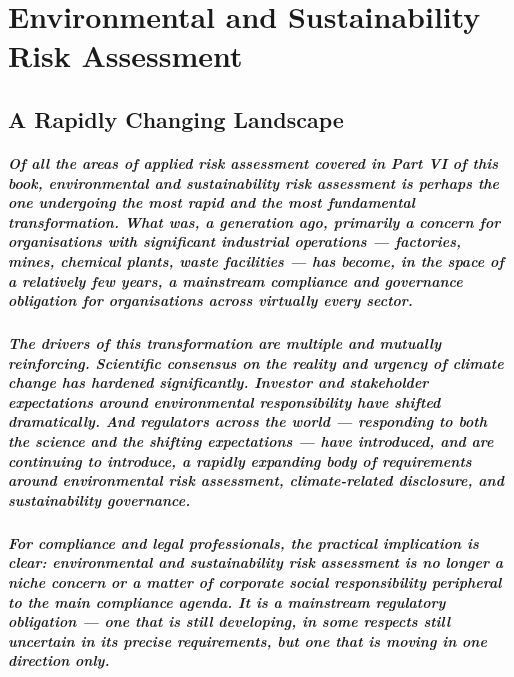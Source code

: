 \chapter{Environmental and Sustainability Risk Assessment}
\label{chap:Environmental and Sustainability Risk Assessment}

\section{A Rapidly Changing Landscape}
\paragraph{Of all the areas of applied risk assessment covered in Part VI of this book, environmental and sustainability risk assessment is perhaps the one undergoing the most rapid and the most fundamental transformation. What was, a generation ago, primarily a concern for organisations with significant industrial operations — factories, mines, chemical plants, waste facilities — has become, in the space of a relatively few years, a mainstream compliance and governance obligation for organisations across virtually every sector.}
\paragraph{The drivers of this transformation are multiple and mutually reinforcing. Scientific consensus on the reality and urgency of climate change has hardened significantly. Investor and stakeholder expectations around environmental responsibility have shifted dramatically. And regulators across the world — responding to both the science and the shifting expectations — have introduced, and are continuing to introduce, a rapidly expanding body of requirements around environmental risk assessment, climate-related disclosure, and sustainability governance.}
\paragraph{For compliance and legal professionals, the practical implication is clear: environmental and sustainability risk assessment is no longer a niche concern or a matter of corporate social responsibility peripheral to the main compliance agenda. It is a mainstream regulatory obligation — one that is still developing, in some respects still uncertain in its precise requirements, but one that is moving in one direction only.}
